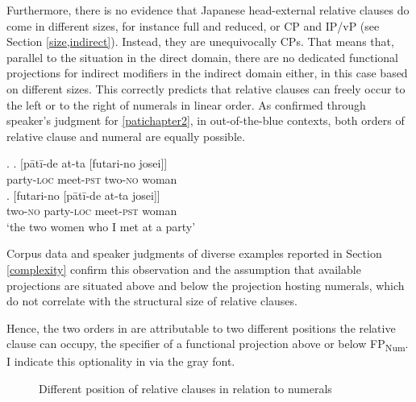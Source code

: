 Furthermore, there is no evidence that Japanese head-external relative clauses do come in different sizes, for instance full and reduced, or CP and IP/vP (see Section \ref{size,indirect}). Instead, they are unequivocally CPs. That means that, parallel to the situation in the direct domain, there are no dedicated functional projections for indirect modifiers in the indirect domain either, in this case based on different sizes. This correctly predicts that relative clauses can freely occur to the left or to the right of numerals in linear order. As confirmed through speaker’s judgment for \ref{patichapter2}, in out-of-the-blue contexts, both orders of relative clause and numeral are equally possible.

\ex. \label{patichapter2} \ag. [pātī-de at-ta [futari-no josei]]\\
party-\textsc{loc} meet-\textsc{pst} two-\textsc{no} woman \label{pati1}\\
\bg. [futari-no [pātī-de at-ta josei]]\\
two-\textsc{no} party-\textsc{loc} meet-\textsc{pst} woman\\
`the two women who I met at a party' \label{pati2}

Corpus data and speaker judgments of diverse examples reported in Section \ref{complexity} confirm this observation and the assumption that available projections are situated above and below the projection hosting numerals, which do not correlate with the structural size of relative clauses.

Hence, the two orders in  are attributable to two different positions the relative clause can occupy, the specifier of a functional projection above or below FP\textsubscript{Num}. I indicate this optionality in  via the gray font.

\begin{figure}
\centering
{}
\caption{Different position of relative clauses in relation to numerals}
\label{Relative clauses above and below numerals}
\end{figure}

